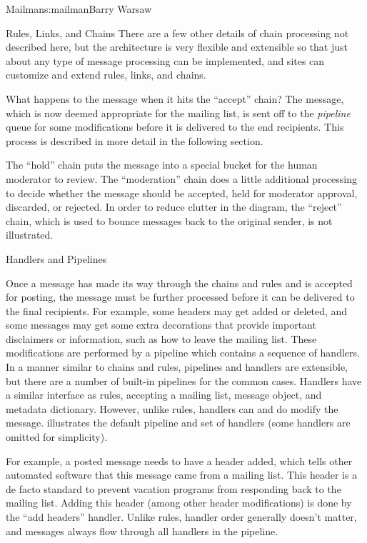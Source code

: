 \begin{aosachapter}{Mailman}{s:mailman}{Barry Warsaw}
\begin{aosasect1}{Rules, Links, and Chains}
There are a few other details of chain processing not described here,
but the architecture is very flexible and extensible so that just
about any type of message processing can be implemented, and sites can
customize and extend rules, links, and chains.

What happens to the message when it hits the ``accept'' chain?  The
message, which is now deemed appropriate for the mailing list, is sent
off to the \emph{pipeline} queue for some modifications before it is
delivered to the end recipients.  This process is described in more
detail in the following section.

The ``hold'' chain puts the message into a special bucket for the
human moderator to review.  The ``moderation'' chain does a little
additional processing to decide whether the message should be
accepted, held for moderator approval, discarded, or rejected.  In
order to reduce clutter in the diagram, the ``reject'' chain, which is
used to bounce messages back to the original sender, is not
illustrated.

\end{aosasect1}

\begin{aosasect1}{Handlers and Pipelines}

Once a message has made its way through the chains and rules and 
is accepted for posting, the message must be further processed
before it can be delivered to the final recipients.  For example, some
headers may get added or deleted, and some messages may get some extra
decorations that provide important disclaimers or information, such as
how to leave the mailing list.  These modifications are performed by a
pipeline which contains a sequence of handlers.  In a
manner similar to chains and rules, pipelines and handlers are
extensible, but there are a number of built-in pipelines for the
common cases.  Handlers have a similar interface as rules, accepting a
mailing list, message object, and metadata dictionary.  However, unlike
rules, handlers can and do modify the message.  
 illustrates the default pipeline and
set of handlers (some handlers are omitted for simplicity).


For example, a posted message needs to have a 
header added, which tells other automated software that this message
came from a mailing list.  This header is a de facto standard to
prevent vacation programs from responding back to the mailing list.
Adding this header (among other header modifications) is done by the
``add headers'' handler.  Unlike rules, handler order generally
doesn't matter, and messages always flow through all handlers in the
pipeline.


\end{aosasect1}
\end{aosachapter}
